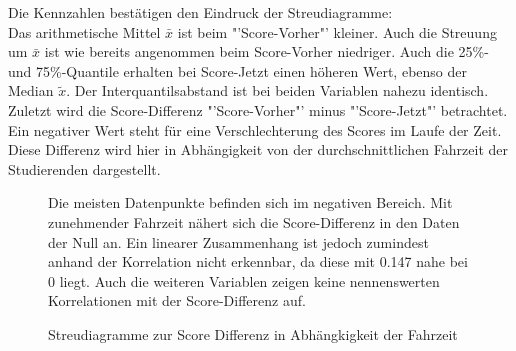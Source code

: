 \documentclass[11pt, a4paper]{article}
\begin{document}
	Die Kennzahlen bestätigen den Eindruck der Streudiagramme:\\
Das arithmetische Mittel $\bar{x}$ ist beim "'Score-Vorher"' kleiner.
Auch die Streuung um $\bar{x}$ ist wie bereits angenommen beim Score-Vorher niedriger. Auch die 25\%- und 75\%-Quantile erhalten bei Score-Jetzt einen höheren Wert, ebenso der Median $\tilde{x}$.
Der Interquantilsabstand ist bei beiden Variablen nahezu identisch. \\

Zuletzt wird die Score-Differenz "'Score-Vorher"' minus "'Score-Jetzt"' betrachtet. 
Ein negativer Wert steht für eine Verschlechterung des Scores im Laufe der Zeit.
Diese Differenz wird hier in Abhängigkeit von der durchschnittlichen Fahrzeit der Studierenden dargestellt.

	
\begin{figure}[h]
	{\centering 
		\vspace{-0.6cm}
		\caption{ Streudiagramme zur Score Differenz in Abhängkigkeit der Fahrzeit }}
		\vspace{0.6cm}
		
	Die meisten Datenpunkte befinden sich im negativen Bereich. Mit zunehmender Fahrzeit nähert sich die Score-Differenz in den Daten der Null an. Ein linearer Zusammenhang ist jedoch zumindest anhand der Korrelation nicht erkennbar, da diese mit 0.147 nahe bei 0 liegt. Auch die weiteren Variablen zeigen keine nennenswerten Korrelationen mit der Score-Differenz auf.
		
		
\end{figure}



\newpage
\end{document}
